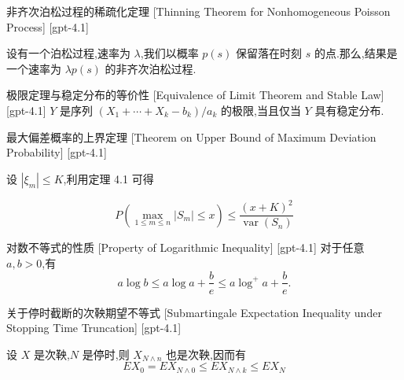 \documentclass[UTF8]{ctexart}
\begin{document}
    
    
    \begin{thm}
        {非齐次泊松过程的稀疏化定理}
        [Thinning Theorem for Nonhomogeneous Poisson Process]
        [gpt-4.1]
        
设有一个泊松过程,速率为 $\lambda$,我们以概率 $p(s)$ 保留落在时刻 $s$ 的点.那么,结果是一个速率为 $\lambda p(s)$ 的非齐次泊松过程.

    \end{thm}
    
    
    
    \begin{thm}
        {极限定理与稳定分布的等价性}
        [Equivalence of Limit Theorem and Stable Law]
        [gpt-4.1]
        $Y$ 是序列 $(X_1 + \cdots + X_k - b_k)/a_k$ 的极限,当且仅当 $Y$ 具有稳定分布.
    \end{thm}
    
    
    
    \begin{thm}
        {最大偏差概率的上界定理}
        [Theorem on Upper Bound of Maximum Deviation Probability]
        [gpt-4.1]
        
设 $|\xi_{m}| \leq K$,利用定理 4.1 可得

\[
P \left( \max_{1 \leq m \leq n} |S_{m}| \leq x \right) \leq \frac{(x + K)^2}{\operatorname{var}(S_{n})}
\]

    \end{thm}
    
    
    
    \begin{ppt}
        {对数不等式的性质}
        [Property of Logarithmic Inequality]
        [gpt-4.1]
        对于任意 $a, b > 0$,有
\[
a \log b \leq a \log a + \frac{b}{e} \leq a \log^{+} a + \frac{b}{e}.
\]

    \end{ppt}
    
    
    
    \begin{thm}
        {关于停时截断的次鞅期望不等式}
        [Submartingale Expectation Inequality under Stopping Time Truncation]
        [gpt-4.1]
        
设 $X$ 是次鞅,$N$ 是停时,则 $X_{N \wedge n}$ 也是次鞅,因而有
\[
E X_0 = E X_{N \wedge 0} \leq E X_{N \wedge k} \leq E X_N
\]

    \end{thm}
    
\end{document}
